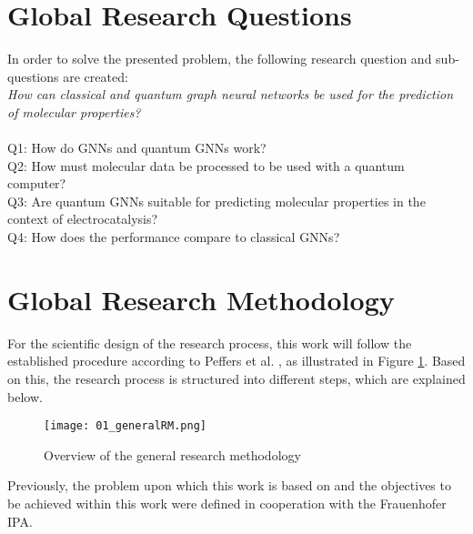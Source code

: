 \section{Global Research Questions}
\label{sec:RQs}
In order to solve the presented problem, the following research question and sub-questions are created: \\
\textit{How can classical and quantum graph neural networks be used for the prediction of molecular properties?}  \\~\\
Q1: How do GNNs and quantum GNNs work? \\
Q2: How must molecular data be processed to be used with a quantum computer? \\
Q3: Are quantum GNNs suitable for predicting molecular properties in the context of electrocatalysis?\\
Q4: How does the performance compare to classical GNNs?

\section{Global Research Methodology}
\label{sec:RM}
For the scientific design of the research process, this work will follow the established procedure according to Peffers et al. \cite{peffers_design_2007}, as illustrated in Figure \ref{img:generalRM}. Based on this, the research process is structured into different steps, which are explained below. 

\begin{figure}[h]
\centering
\texttt{[image: 01\_generalRM.png]}
\caption[Overview of the general research methodology]{\label{img:generalRM}{Overview of the general research methodology \cite{peffers_design_2007}}}    
\end{figure} 

Previously, the problem upon which this work is based on and the objectives to be achieved within this work were defined in cooperation with the Frauenhofer IPA. \\

